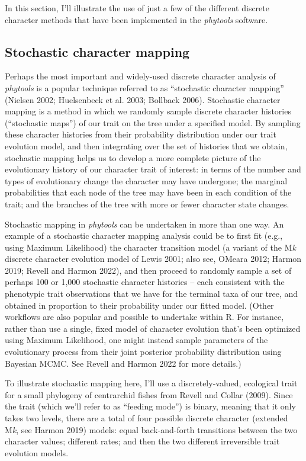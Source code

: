 \documentclass[fleqn,10pt,lineno]{wlpeerj} %
\begin{document}
In this section, I'll illustrate the use of just a few of the different discrete character methods that have been implemented in the \emph{phytools} software.

\hypertarget{stochastic-character-mapping}{%
\subsection{Stochastic character mapping}\label{stochastic-character-mapping}}

Perhaps the most important and widely-used discrete character analysis of \emph{phytools} is a popular technique referred to as ``stochastic character mapping'' (Nielsen 2002; Huelsenbeck et al. 2003; Bollback 2006). Stochastic character mapping is a method in which we randomly sample discrete character histories (``stochastic maps'') of our trait on the tree under a specified model. By sampling these character histories from their probability distribution under our trait evolution model, and then integrating over the set of histories that we obtain, stochastic mapping helps us to develop a more complete picture of the evolutionary history of our character trait of interest: in terms of the number and types of evolutionary change the character may have undergone; the marginal probabilities that each node of the tree may have been in each condition of the trait; and the branches of the tree with more or fewer character state changes.

Stochastic mapping in \emph{phytools} can be undertaken in more than one way. An example of a stochastic character mapping analysis could be to first fit (e.g., using Maximum Likelihood) the character transition model (a variant of the M\emph{k} discrete character evolution model of Lewis 2001; also see, OMeara 2012; Harmon 2019; Revell and Harmon 2022), and then proceed to randomly sample a set of perhaps 100 or 1,000 stochastic character histories -- each consistent with the phenotypic trait observations that we have for the terminal taxa of our tree, and obtained in proportion to their probability under our fitted model. (Other workflows are also popular and possible to undertake within R. For instance, rather than use a single, fixed model of character evolution that's been optimized using Maximum Likelihood, one might instead sample parameters of the evolutionary process from their joint posterior probability distribution using Bayesian MCMC. See Revell and Harmon 2022 for more details.)

To illustrate stochastic mapping here, I'll use a discretely-valued, ecological trait for a small phylogeny of centrarchid fishes from Revell and Collar (2009). Since the trait (which we'll refer to as ``feeding mode'') is binary, meaning that it only takes two levels, there are a total of four possible discrete character (extended M\emph{k}, see Harmon 2019) models: equal back-and-forth transitions between the two character values; different rates; and then the two different irreversible trait evolution models.
\end{document}
